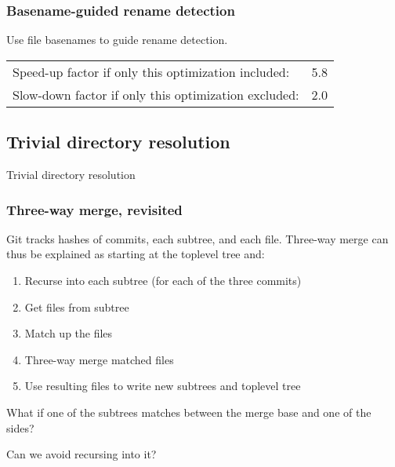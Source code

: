 \documentclass[compress,t]{beamer}
\begin{document}
\begin{frame}
  \frametitle{Basename-guided rename detection}

  Use file basenames to guide rename detection.

  \pause
  \vspace*{\baselineskip}
  \begin{tabular}{lr}
    Speed-up factor if only this optimization included:  & 5.8 \\
    Slow-down factor if only this optimization excluded: & 2.0
  \end{tabular}

\end{frame}

\subsection[Directories]{Trivial directory resolution}

\begin{frame}
  \vfill
  \vspace*{2\baselineskip}
  {\Huge
  \begin{center}Trivial directory resolution\end{center}
  }
  \vfill
\end{frame}


\begin{frame}
  \frametitle{Three-way merge, revisited}

  Git tracks hashes of commits, each subtree, and each file.
  Three-way merge can thus be explained as starting at the toplevel
  tree and:
  
  \begin{enumerate}[<+(1)->]
    \item Recurse into each subtree (for each of the three commits)
    \item Get files from subtree
    \item Match up the files 
    \item Three-way merge matched files
    \item Use resulting files to write new subtrees and toplevel tree
  \end{enumerate}

  \pause
  \vspace*{\baselineskip}
  What if one of the subtrees matches between the merge base and one of the
  sides?

  \pause
  \vspace*{\baselineskip}
  Can we avoid recursing into it?

\end{frame}
\end{document}
